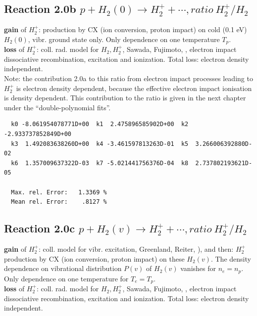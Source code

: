 \documentclass[12pt,dvips]{article}
\begin{document}
\subsection{
Reaction 2.0b     $ p + H_2(0) \rightarrow  H_2^+ + \cdots, ratio  \ H_2^+/H_2$
}
\textbf{gain }of $H_2^+$:
production by CX (ion conversion, proton impact) on cold (0.1 eV) $H_2(0)$, vibr. ground state only.
Only dependence on one temperature  $T_p$.
\\
\textbf{loss }of $H_2^+$: coll. rad. model for $H_2, H_2^+$, Sawada, Fujimoto, \cite{kn:Sawada},
electron impact dissociative recombination, excitation and ionization. Total loss: electron density independent.\\

Note: the contribution 2.0a to this ratio from electron impact processes leading to $H_2^+$ is electron density dependent,
because the effective electron impact ionisation is density dependent.
This contribution to the ratio is given in the next chapter under the ``double-polynomial fits''.
\medskip


\begin{small}\begin{verbatim}
  k0 -8.061954078771D+00  k1  2.475896585902D+00  k2 -2.933737852849D+00
  k3  1.492083638260D+00  k4 -3.461597813263D-01  k5  3.266006392880D-02
  k6  1.357009637322D-03  k7 -5.021441756376D-04  k8  2.737802193621D-05

  Max. rel. Error:   1.3369 %
  Mean rel. Error:    .8127 %

\end{verbatim}\end{small}

\subsection{
Reaction 2.0c   $p + H_2(v) \rightarrow H_2^+ + \cdots , ratio  \ H_2^+/H_2$
}
\textbf{gain }of $H_2^+$: coll. model for vibr. excitation, Greenland, Reiter, \cite{kn:Green}),
and then: $H_2^+$ production by CX (ion conversion, proton impact) on these $H_2(v)$.
The density dependence on vibrational distribution $P(v)$ of $H_2(v)$ vanishes for $n_e=n_p$.
Only dependence on one temperature for $T_e=T_p$.
\\
\textbf{loss }of $H_2^+$: coll. rad. model for $H_2, H_2^+$, Sawada, Fujimoto, \cite{kn:Sawada},
electron impact dissociative recombination, excitation and ionization. Total loss: electron density independent.\\
\end{document}
